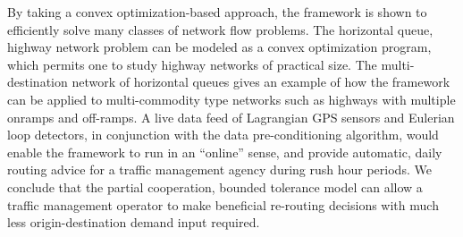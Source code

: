 By taking a convex optimization-based approach, the framework is shown
to efficiently solve many classes of network flow problems. The horizontal
queue, highway network problem can be modeled as a convex optimization
program, which permits one to study highway networks of practical
size. The multi-destination network of horizontal queues gives an
example of how the framework can be applied to multi-commodity type
networks such as highways with multiple onramps and off-ramps. A live
data feed of Lagrangian GPS sensors and Eulerian loop detectors, in
conjunction with the data pre-conditioning algorithm, would enable
the framework to run in an ``online'' sense, and provide automatic,
daily routing advice for a traffic management agency during rush hour
periods. We conclude that the partial cooperation, bounded tolerance
model can allow a traffic management operator to make beneficial re-routing
decisions with much less origin-destination demand input required. 
